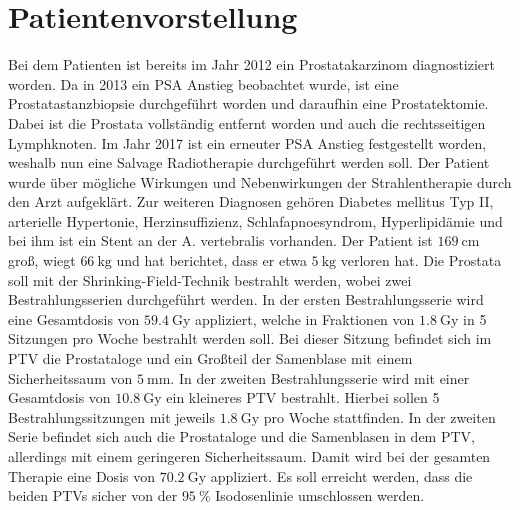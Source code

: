 \section{Patientenvorstellung}
\label{sec:Patientenvorstellung}
Bei dem Patienten ist bereits im Jahr 2012 ein Prostatakarzinom diagnostiziert worden.
Da in 2013 ein PSA Anstieg beobachtet wurde, ist eine Prostatastanzbiopsie durchgeführt worden und daraufhin eine Prostatektomie.
Dabei ist die Prostata vollständig entfernt worden und auch die rechtsseitigen Lymphknoten.
Im Jahr 2017 ist ein erneuter PSA Anstieg festgestellt worden, weshalb nun eine Salvage Radiotherapie durchgeführt werden soll.
Der Patient wurde über mögliche Wirkungen und Nebenwirkungen der Strahlentherapie durch den Arzt aufgeklärt.
Zur weiteren Diagnosen gehören Diabetes mellitus Typ II, arterielle
Hypertonie, Herzinsuffizienz, Schlafapnoesyndrom, Hyperlipidämie und bei ihm ist ein Stent an der A. vertebralis vorhanden.
Der Patient ist $\SI{169}{\centi\meter}$ groß, wiegt $\SI{66}{\kilogram}$ und hat berichtet,
dass er etwa $\SI{5}{\kilogram}$ verloren hat. Die Prostata soll mit der Shrinking-Field-Technik bestrahlt werden, wobei
zwei Bestrahlungsserien durchgeführt werden. In der ersten Bestrahlungsserie wird eine Gesamtdosis von $\SI{59,4}{\gray}$ appliziert,
welche in Fraktionen von $\SI{1,8}{\gray}$ in 5 Sitzungen pro Woche bestrahlt werden soll. Bei dieser Sitzung befindet sich im PTV die Prostataloge
und ein Großteil der Samenblase mit einem Sicherheitssaum von $\SI{5}{\milli\meter}$.
In der zweiten Bestrahlungsserie wird mit einer
Gesamtdosis von $\SI{10,8}{\gray}$ ein kleineres PTV bestrahlt. Hierbei sollen 5 Bestrahlungssitzungen mit jeweils $\SI{1,8}{\gray}$ pro Woche stattfinden.
In der zweiten Serie befindet sich auch die Prostataloge und die Samenblasen in dem PTV, allerdings mit einem geringeren Sicherheitssaum.
Damit wird bei der gesamten Therapie eine Dosis von $\SI{70,2}{\gray}$ appliziert.
Es soll erreicht werden, dass die beiden PTVs sicher von der $\SI{95}{\percent}$ Isodosenlinie umschlossen werden.
